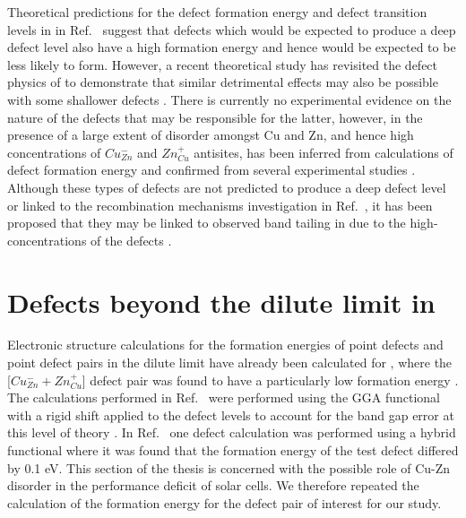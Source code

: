\documentclass[11pt, twoside]{report}
\begin{document}
Theoretical predictions for the defect formation energy and defect transition levels in {\CZTS} in Ref.~ suggest that defects which would be expected to produce a deep defect level also have a high formation energy and hence would be expected to be less likely to form.
However, a recent theoretical study has revisited the defect physics of {\CZTS} to demonstrate that similar detrimental effects may also be possible with some shallower defects \cite{Sunghyun_killer_defects}.
There is currently no experimental evidence on the nature of the defects that may be responsible for the latter, however, in {\CZTS} the presence of a large extent of disorder amongst Cu and Zn, and hence high concentrations of $Cu_{Zn}^{-}$ and $Zn_{Cu}^{+}$ antisites, has been inferred from calculations of defect formation energy \cite{defects_Chen} and confirmed from several experimental studies \cite{Schorr, CZTS_Xray, CZTS_TEM}. Although these types of defects are not predicted to produce a deep defect level or linked to the recombination mechanisms investigation in Ref.~, it has been proposed that they may be linked to observed band tailing in {\CZTS} due to the high-concentrations of the defects \cite{band_tail}.




\section{Defects beyond the dilute limit in {\CZTS}}\label{CZTS_beyond_dilute}
Electronic structure calculations for the formation energies of point defects and point defect pairs in the dilute limit have already been calculated for {\CZTS}, where the [$Cu_{Zn}^- + Zn_{Cu}^+$] defect pair was found to have a particularly low formation energy \cite{defects_Chen}.
The calculations performed in Ref.~ were performed using the GGA functional with a rigid shift applied to the defect levels to account for the band gap error at this level of theory \cite{Lany_defects}. In Ref.~ one defect calculation was performed using a hybrid functional where it was found that the formation energy of the test defect differed by 0.1 eV. This section of the thesis is concerned with the possible role of Cu-Zn disorder in the performance deficit of {\CZTS} solar cells. We therefore repeated the calculation of the formation energy for the defect pair of interest for our study.
\end{document}
